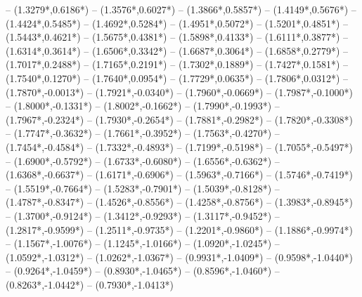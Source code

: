 {	-- ({1.3279*\dx},{0.6186*\dy})
	-- ({1.3576*\dx},{0.6027*\dy})
	-- ({1.3866*\dx},{0.5857*\dy})
	-- ({1.4149*\dx},{0.5676*\dy})
	-- ({1.4424*\dx},{0.5485*\dy})
	-- ({1.4692*\dx},{0.5284*\dy})
	-- ({1.4951*\dx},{0.5072*\dy})
	-- ({1.5201*\dx},{0.4851*\dy})
	-- ({1.5443*\dx},{0.4621*\dy})
	-- ({1.5675*\dx},{0.4381*\dy})
	-- ({1.5898*\dx},{0.4133*\dy})
	-- ({1.6111*\dx},{0.3877*\dy})
	-- ({1.6314*\dx},{0.3614*\dy})
	-- ({1.6506*\dx},{0.3342*\dy})
	-- ({1.6687*\dx},{0.3064*\dy})
	-- ({1.6858*\dx},{0.2779*\dy})
	-- ({1.7017*\dx},{0.2488*\dy})
	-- ({1.7165*\dx},{0.2191*\dy})
	-- ({1.7302*\dx},{0.1889*\dy})
	-- ({1.7427*\dx},{0.1581*\dy})
	-- ({1.7540*\dx},{0.1270*\dy})
	-- ({1.7640*\dx},{0.0954*\dy})
	-- ({1.7729*\dx},{0.0635*\dy})
	-- ({1.7806*\dx},{0.0312*\dy})
	-- ({1.7870*\dx},{-0.0013*\dy})
	-- ({1.7921*\dx},{-0.0340*\dy})
	-- ({1.7960*\dx},{-0.0669*\dy})
	-- ({1.7987*\dx},{-0.1000*\dy})
	-- ({1.8000*\dx},{-0.1331*\dy})
	-- ({1.8002*\dx},{-0.1662*\dy})
	-- ({1.7990*\dx},{-0.1993*\dy})
	-- ({1.7967*\dx},{-0.2324*\dy})
	-- ({1.7930*\dx},{-0.2654*\dy})
	-- ({1.7881*\dx},{-0.2982*\dy})
	-- ({1.7820*\dx},{-0.3308*\dy})
	-- ({1.7747*\dx},{-0.3632*\dy})
	-- ({1.7661*\dx},{-0.3952*\dy})
	-- ({1.7563*\dx},{-0.4270*\dy})
	-- ({1.7454*\dx},{-0.4584*\dy})
	-- ({1.7332*\dx},{-0.4893*\dy})
	-- ({1.7199*\dx},{-0.5198*\dy})
	-- ({1.7055*\dx},{-0.5497*\dy})
	-- ({1.6900*\dx},{-0.5792*\dy})
	-- ({1.6733*\dx},{-0.6080*\dy})
	-- ({1.6556*\dx},{-0.6362*\dy})
	-- ({1.6368*\dx},{-0.6637*\dy})
	-- ({1.6171*\dx},{-0.6906*\dy})
	-- ({1.5963*\dx},{-0.7166*\dy})
	-- ({1.5746*\dx},{-0.7419*\dy})
	-- ({1.5519*\dx},{-0.7664*\dy})
	-- ({1.5283*\dx},{-0.7901*\dy})
	-- ({1.5039*\dx},{-0.8128*\dy})
	-- ({1.4787*\dx},{-0.8347*\dy})
	-- ({1.4526*\dx},{-0.8556*\dy})
	-- ({1.4258*\dx},{-0.8756*\dy})
	-- ({1.3983*\dx},{-0.8945*\dy})
	-- ({1.3700*\dx},{-0.9124*\dy})
	-- ({1.3412*\dx},{-0.9293*\dy})
	-- ({1.3117*\dx},{-0.9452*\dy})
	-- ({1.2817*\dx},{-0.9599*\dy})
	-- ({1.2511*\dx},{-0.9735*\dy})
	-- ({1.2201*\dx},{-0.9860*\dy})
	-- ({1.1886*\dx},{-0.9974*\dy})
	-- ({1.1567*\dx},{-1.0076*\dy})
	-- ({1.1245*\dx},{-1.0166*\dy})
	-- ({1.0920*\dx},{-1.0245*\dy})
	-- ({1.0592*\dx},{-1.0312*\dy})
	-- ({1.0262*\dx},{-1.0367*\dy})
	-- ({0.9931*\dx},{-1.0409*\dy})
	-- ({0.9598*\dx},{-1.0440*\dy})
	-- ({0.9264*\dx},{-1.0459*\dy})
	-- ({0.8930*\dx},{-1.0465*\dy})
	-- ({0.8596*\dx},{-1.0460*\dy})
	-- ({0.8263*\dx},{-1.0442*\dy})
	-- ({0.7930*\dx},{-1.0413*\dy})
}
